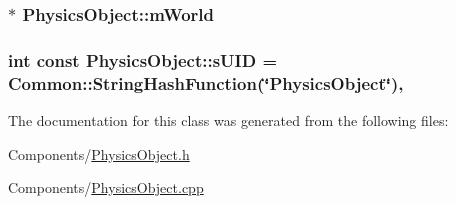 \subsubsection[{\texorpdfstring{m\+World}{mWorld}}]{$\ast$ Physics\+Object\+::m\+World\hspace{0.3cm}{\ttfamily [private]}}\hypertarget{classPhysicsObject_a020b80e399784584c4d698c2f1cbd73b}{}\label{classPhysicsObject_a020b80e399784584c4d698c2f1cbd73b}
\subsubsection[{\texorpdfstring{s\+U\+ID}{sUID}}]{\setlength{\rightskip}{0pt plus 5cm}int const Physics\+Object\+::s\+U\+ID = {\bf Common\+::\+String\+Hash\+Function}(\char`\"{}Physics\+Object\char`\"{})\hspace{0.3cm}{\ttfamily [static]}, {\ttfamily [private]}}\hypertarget{classPhysicsObject_ae53856b261838ff637770c08450305b1}{}\label{classPhysicsObject_ae53856b261838ff637770c08450305b1}


The documentation for this class was generated from the following files\+:\begin{DoxyCompactItemize}
\item 
Components/\hyperlink{PhysicsObject_8h}{Physics\+Object.\+h}\item 
Components/\hyperlink{PhysicsObject_8cpp}{Physics\+Object.\+cpp}\end{DoxyCompactItemize}
